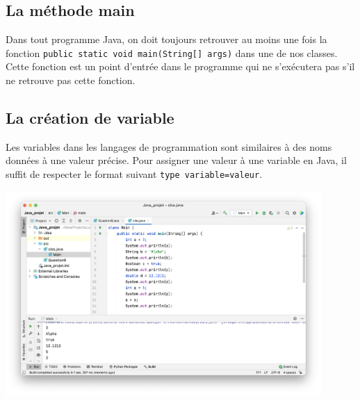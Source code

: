 \subsection{La méthode main}
Dans tout programme Java, on doit toujours retrouver au moins une fois la fonction \lstinline{public static void main(String[] args)} dans une de nos classes. Cette fonction est un point d'entrée dans le programme qui ne s'exécutera pas s'il ne retrouve pas cette fonction.
\subsection{La création de variable}

Les variables dans les langages de programmation sont similaires à des noms données à une valeur précise.
Pour assigner une valeur à une variable en Java, il suffit de respecter le format suivant \lstinline{type variable=valeur}.

\begin{center}
\includegraphics[width=12cm]{8j}	
\end{center}

